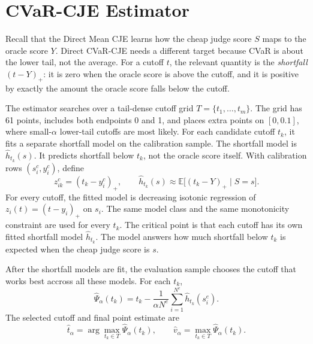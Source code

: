 \documentclass[11pt]{article}
\begin{document}
\FloatBarrier

\section{CVaR-CJE Estimator}

Recall that the Direct Mean CJE learns how the cheap judge score \(S\) maps to the oracle score
\(Y\).  Direct CVaR-CJE needs a different target because CVaR is about the
lower tail, not the average.  For a cutoff \(t\), the relevant quantity is the
\textit{shortfall} \((t-Y)_+\): it is zero when the oracle score is above the cutoff,
and it is positive by exactly the amount the oracle score falls below the
cutoff.

The estimator searches over a tail-dense cutoff grid \(T=\{t_1,\ldots,t_m\}\).
The grid has 61 points, includes both endpoints 0 and 1, and places extra
points on \([0,0.1]\), where small-\(\alpha\) lower-tail cutoffs are most likely.
For each candidate cutoff \(t_k\), it fits a separate shortfall model on the
calibration sample.  The shortfall model is \(\hat h_{t_k}(s)\).  It predicts
shortfall below \(t_k\), not the oracle score itself.  With calibration rows
\((s_i^c,y_i^c)\), define
\[
  z_{ik}^c=(t_k-y_i^c)_+,
  \qquad
  \hat h_{t_k}(s)
  \approx
  \mathbb{E}\bigl[(t_k-Y)_+ \mid S=s\bigr].
\]
For every cutoff, the fitted model is decreasing isotonic regression of
\(z_i(t)=(t-y_i)_+\) on \(s_i\).  The same model class and the same monotonicity
constraint are used for every \(t_k\). The critical point is that each cutoff has its own fitted shortfall model
\(\hat h_{t_k}\). The model answers how much shortfall below \(t_k\) is
expected when the cheap judge score is \(s\).

After the shortfall models are fit, the evaluation sample chooses the cutoff that works best accross all these models.
For each
\(t_k\),
\[
  \hat\Psi_\alpha(t_k)
  =
  t_k
  -
  \frac{1}{\alpha N^e}
  \sum_{i=1}^{N^e} \hat h_{t_k}(s_i^e).
\]
The selected cutoff and final point estimate are
\[
  \hat t_\alpha
  =
  \arg\max_{t_k \in T}\hat\Psi_\alpha(t_k),
  \qquad
  \hat v_\alpha
  =
  \max_{t_k \in T}\hat\Psi_\alpha(t_k).
\]
\end{document}
